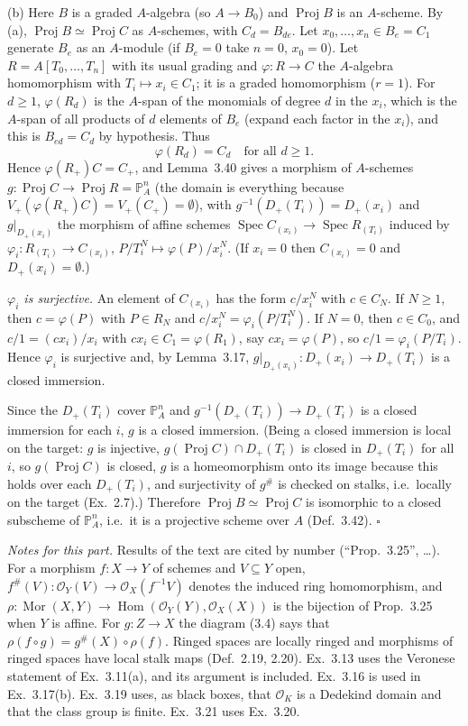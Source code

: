 \documentclass[11pt]{article}
\begin{document}
(b) Here $B$ is a graded $A$-algebra (so $A\to B_0$) and $\operatorname{Proj}B$ is an $A$-scheme. By (a), $\operatorname{Proj}B\simeq\operatorname{Proj}C$ as $A$-schemes, with $C_d=B_{de}$. Let $x_0,\dots,x_n\in B_e=C_1$ generate $B_e$ as an $A$-module (if $B_e=0$ take $n=0$, $x_0=0$). Let $R=A[T_0,\dots,T_n]$ with its usual grading and $\varphi:R\to C$ the $A$-algebra homomorphism with $T_i\mapsto x_i\in C_1$; it is a graded homomorphism ($r=1$). For $d\geq1$, $\varphi(R_d)$ is the $A$-span of the monomials of degree $d$ in the $x_i$, which is the $A$-span of all products of $d$ elements of $B_e$ (expand each factor in the $x_i$), and this is $B_{ed}=C_d$ by hypothesis. Thus
\[ \varphi(R_d)=C_d\quad\text{for all }d\geq1. \]
Hence $\varphi(R_+)C=C_+$, and Lemma~3.40 gives a morphism of $A$-schemes $g:\operatorname{Proj}C\to\operatorname{Proj}R=\mathbb{P}^n_A$ (the domain is everything because $V_+(\varphi(R_+)C)=V_+(C_+)=\emptyset$), with $g^{-1}(D_+(T_i))=D_+(x_i)$ and $g|_{D_+(x_i)}$ the morphism of affine schemes $\operatorname{Spec}C_{(x_i)}\to\operatorname{Spec}R_{(T_i)}$ induced by $\varphi_i:R_{(T_i)}\to C_{(x_i)}$, $P/T_i^N\mapsto\varphi(P)/x_i^N$. (If $x_i=0$ then $C_{(x_i)}=0$ and $D_+(x_i)=\emptyset$.)

\emph{$\varphi_i$ is surjective.} An element of $C_{(x_i)}$ has the form $c/x_i^N$ with $c\in C_N$. If $N\geq1$, then $c=\varphi(P)$ with $P\in R_N$ and $c/x_i^N=\varphi_i(P/T_i^N)$. If $N=0$, then $c\in C_0$, and $c/1=(cx_i)/x_i$ with $cx_i\in C_1=\varphi(R_1)$, say $cx_i=\varphi(P)$, so $c/1=\varphi_i(P/T_i)$. Hence $\varphi_i$ is surjective and, by Lemma~3.17, $g|_{D_+(x_i)}:D_+(x_i)\to D_+(T_i)$ is a closed immersion.

Since the $D_+(T_i)$ cover $\mathbb{P}^n_A$ and $g^{-1}(D_+(T_i))\to D_+(T_i)$ is a closed immersion for each $i$, $g$ is a closed immersion. (Being a closed immersion is local on the target: $g$ is injective, $g(\operatorname{Proj}C)\cap D_+(T_i)$ is closed in $D_+(T_i)$ for all $i$, so $g(\operatorname{Proj}C)$ is closed, $g$ is a homeomorphism onto its image because this holds over each $D_+(T_i)$, and surjectivity of $g^{\#}$ is checked on stalks, i.e.\ locally on the target (Ex.~2.7).) Therefore $\operatorname{Proj}B\simeq\operatorname{Proj}C$ is isomorphic to a closed subscheme of $\mathbb{P}^n_A$, i.e.\ it is a projective scheme over $A$ (Def.~3.42). \hfill$\square$

\emph{Notes for this part.} Results of the text are cited by number (``Prop.~3.25'', \dots). For a morphism $f:X\to Y$ of schemes and $V\subseteq Y$ open, $f^\#(V):\mathcal{O}_Y(V)\to\mathcal{O}_X(f^{-1}V)$ denotes the induced ring homomorphism, and $\rho:\operatorname{Mor}(X,Y)\to\operatorname{Hom}(\mathcal{O}_Y(Y),\mathcal{O}_X(X))$ is the bijection of Prop.~3.25 when $Y$ is affine. For $g:Z\to X$ the diagram (3.4) says that $\rho(f\circ g)=g^\#(X)\circ\rho(f)$. Ringed spaces are locally ringed and morphisms of ringed spaces have local stalk maps (Def.~2.19, 2.20). Ex.~3.13 uses the Veronese statement of Ex.~3.11(a), and its argument is included. Ex.~3.16 is used in Ex.~3.17(b). Ex.~3.19 uses, as black boxes, that $\mathcal{O}_K$ is a Dedekind domain and that the class group is finite. Ex.~3.21 uses Ex.~3.20.
\end{document}
